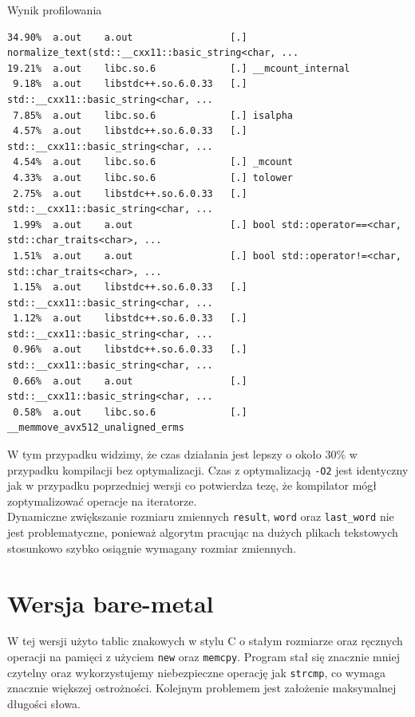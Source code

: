 \documentclass[12pt]{article}
\begin{document}
Wynik profilowania
\begin{verbatim}
34.90%  a.out    a.out                 [.] normalize_text(std::__cxx11::basic_string<char, ...
19.21%  a.out    libc.so.6             [.] __mcount_internal
 9.18%  a.out    libstdc++.so.6.0.33   [.] std::__cxx11::basic_string<char, ...
 7.85%  a.out    libc.so.6             [.] isalpha
 4.57%  a.out    libstdc++.so.6.0.33   [.] std::__cxx11::basic_string<char, ...
 4.54%  a.out    libc.so.6             [.] _mcount
 4.33%  a.out    libc.so.6             [.] tolower
 2.75%  a.out    libstdc++.so.6.0.33   [.] std::__cxx11::basic_string<char, ...
 1.99%  a.out    a.out                 [.] bool std::operator==<char, std::char_traits<char>, ...
 1.51%  a.out    a.out                 [.] bool std::operator!=<char, std::char_traits<char>, ...
 1.15%  a.out    libstdc++.so.6.0.33   [.] std::__cxx11::basic_string<char, ...
 1.12%  a.out    libstdc++.so.6.0.33   [.] std::__cxx11::basic_string<char, ...
 0.96%  a.out    libstdc++.so.6.0.33   [.] std::__cxx11::basic_string<char, ...
 0.66%  a.out    a.out                 [.] std::__cxx11::basic_string<char, ...
 0.58%  a.out    libc.so.6             [.] __memmove_avx512_unaligned_erms
\end{verbatim}

W tym przypadku widzimy, że czas działania jest lepszy o około $30\%$ w przypadku
kompilacji bez optymalizacji. Czas z optymalizacją \verb|-O2| jest identyczny jak
w przypadku poprzedniej wersji co potwierdza tezę, że kompilator mógł zoptymalizować
operacje na iteratorze. \\

Dynamiczne zwiększanie rozmiaru zmiennych \verb|result|, \verb|word| oraz \verb|last_word|
nie jest problematyczne, ponieważ algorytm pracując na dużych plikach tekstowych stosunkowo
szybko osiągnie wymagany rozmiar zmiennych.







\section*{Wersja bare-metal}
W tej wersji użyto tablic znakowych w stylu C o stałym rozmiarze oraz ręcznych operacji
na pamięci z użyciem \verb|new| oraz \verb|memcpy|. Program stał się znacznie mniej 
czytelny oraz wykorzystujemy niebezpieczne operację jak \verb|strcmp|, co wymaga 
znacznie większej ostrożności. Kolejnym problemem jest założenie maksymalnej długości
słowa.
\end{document}
